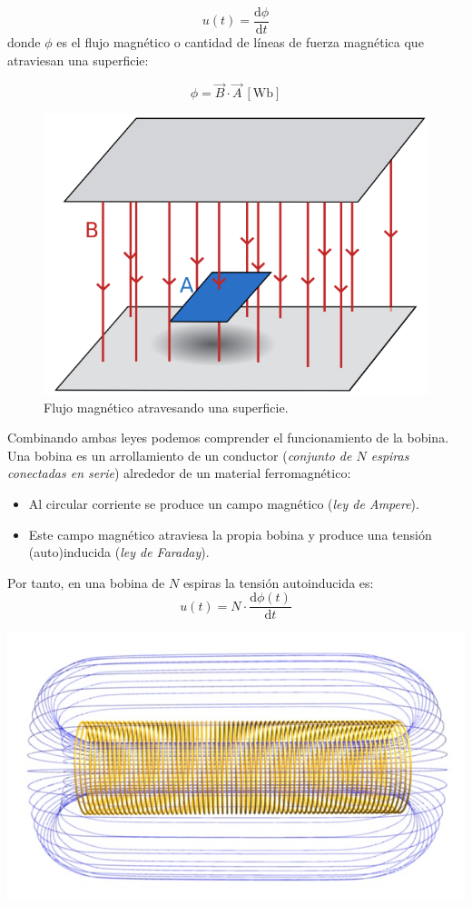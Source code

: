 \[
u(t) = \frac{\mathrm{d}\phi}{\mathrm{d}t} 
\]
donde $\phi$ es el flujo magnético o cantidad de líneas de fuerza magnética que atraviesan una superficie:

\[
\phi = \vec{B} \cdot \vec{A} \ [\mathrm{Wb}]
\]

\begin{figure}
  \centering
  \includegraphics[height=0.2\textheight]{../figs/flujo_magnetico.pdf}
  \caption{Flujo magnético atravesando una superficie.}
  \label{fig:flujo-magnetico}
\end{figure}

Combinando ambas leyes podemos comprender el funcionamiento de la bobina. Una bobina es un arrollamiento de un conductor (\emph{conjunto de $N$ espiras conectadas en serie}) alrededor de un material ferromagnético:
\begin{itemize}
\item Al circular corriente se produce un campo magnético (\emph{ley de Ampere}).
\item Este campo magnético atraviesa la propia bobina y produce una tensión (auto)inducida (\emph{ley de Faraday}).
\end{itemize}

Por tanto, en una bobina de $N$ espiras la tensión autoinducida es:
\[
u(t) = N \cdot \frac{\mathrm{d}\phi(t)}{\mathrm{d} t}
\]

\begin{center}
\includegraphics[height=0.2\textheight]{../figs/Solenoide.jpg}
\end{center}

